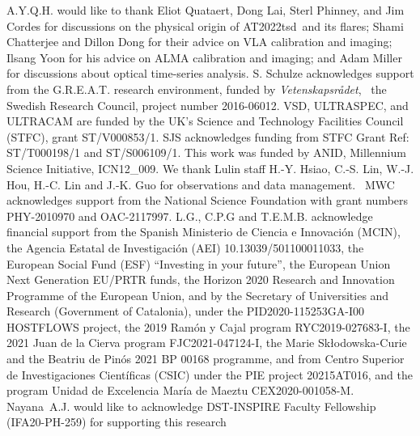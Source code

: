 \documentclass{nature_plusfigure}
\newcommand{\at}{AT2022tsd}
\begin{document}
\begin{addendum}

\item A.Y.Q.H. would like to thank Eliot Quataert, Dong Lai, Sterl Phinney, and Jim Cordes for discussions on the physical origin of \at\ and its flares; Shami Chatterjee and Dillon Dong for their advice on VLA calibration and imaging; Ilsang Yoon for his advice on ALMA calibration and imaging; and Adam Miller for discussions about optical time-series analysis.
S. Schulze acknowledges support from the G.R.E.A.T. research environment, funded by {\em Vetenskapsr\aa det},  the Swedish Research Council, project number 2016-06012.
VSD, ULTRASPEC, and ULTRACAM are funded by the UK’s Science and Technology Facilities Council (STFC), grant ST/V000853/1.
SJS acknowledges funding from STFC Grant Ref: ST/T000198/1 and ST/S006109/1.
This work was funded by ANID, Millennium Science Initiative, ICN12\_009.
We thank Lulin staff H.-Y. Hsiao, C.-S. Lin, W.-J. Hou, H.-C. Lin and J.-K. Guo for observations and data management. 
MWC acknowledges support from the National Science Foundation with grant numbers PHY-2010970 and OAC-2117997.
L.G., C.P.G and T.E.M.B. acknowledge financial support from the Spanish Ministerio de Ciencia e Innovaci\'on (MCIN), the Agencia Estatal de Investigaci\'on (AEI) 10.13039/501100011033, the European Social Fund (ESF) “Investing in your future”, the European Union Next Generation EU/PRTR funds, the Horizon 2020 Research and Innovation Programme of the European Union, and by the Secretary of Universities and Research (Government of Catalonia), under the PID2020-115253GA-I00 HOSTFLOWS project, the 2019 Ram\'on y Cajal program RYC2019-027683-I, the 2021 Juan de la Cierva program FJC2021-047124-I, the Marie Skłodowska-Curie and the Beatriu de Pin\'os 2021 BP 00168 programme, and from Centro Superior de Investigaciones Cient\'ificas (CSIC) under the PIE project 20215AT016, and the program Unidad de Excelencia Mar\'ia de Maeztu CEX2020-001058-M.
Nayana A.J. would like to acknowledge DST-INSPIRE Faculty Fellowship (IFA20-PH-259) for supporting this research

\end{addendum}
\end{document}
